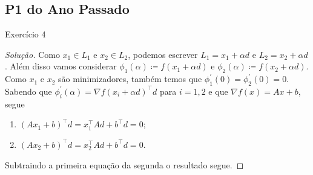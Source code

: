 \documentclass[12pt,twoside,a4paper]{article}
\begin{document}
\subsection{P1 do Ano Passado}
\begin{problema}
  Exercício 4
\end{problema}
\begin{proof}[Solução]
Como \(x_1\in L_1\) e \(x_2\in L_2\), podemos escrever \(L_1=x_1+\alpha d\) e
\(L_2=x_2+\alpha d\). Além disso vamos considerar \(\phi_1(\alpha)\coloneqq
f(x_1+\alpha d)\) e \(\phi_2(\alpha)\coloneqq f(x_2+\alpha d)\). Como \(x_1\) e
\(x_2\) são minimizadores, também temos que
\(\phi_1^\prime(0)=\phi_2^\prime(0)=0.\) Sabendo que
\(\phi_i^\prime(\alpha)=\nabla f(x_i+\alpha d)^\top d\) para \(i=1,2\) e que
\(\nabla f(x)=Ax+b\), segue
\begin{enumerate}
\item \((Ax_1+b)^\top d= x_1^\top Ad +b^\top d = 0\);
\item \((Ax_2+b)^\top d= x_2^\top Ad+ b^\top d = 0\).  
\end{enumerate}

Subtraindo a primeira equação da segunda o resultado segue.

\end{proof}
\end{document}
